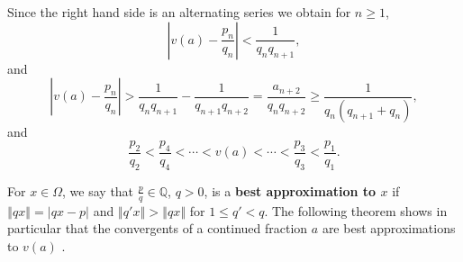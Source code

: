 \documentclass{amsart}
\newcommand{\norm}[1]{\left\Vert #1 \right\Vert}
\begin{document}
Since the right hand side is an alternating series we obtain for $n \geq 1$,
\begin{equation}
\left|  v(a)-\frac{p_n}{q_n} \right| < \frac{1}{q_n q_{n+1}},
\label{upperbound}
\end{equation}
and 
\begin{equation}
\left|  v(a)-\frac{p_n}{q_n} \right| > \frac{1}{q_nq_{n+1}}-\frac{1}{q_{n+1}q_{n+2}}=\frac{a_{n+2}}{q_n q_{n+2}} \geq \frac{1}{q_n(q_{n+1}+q_n)},
\label{lowerbound}
\end{equation}
and
\begin{equation}
\frac{p_2}{q_2}<\frac{p_4}{q_4}<\cdots<v(a)<\cdots<\frac{p_3}{q_3}<\frac{p_1}{q_1}.
\label{signs}
\end{equation}

For $x \in \Omega$, we say that $\frac{p}{q} \in \mathbb{Q}$, $q>0$, is a \textbf{best approximation to $x$}
if $\norm{qx} = |qx-p|$ and $\norm{q' x} > \norm{qx}$ for $1 \leq q'<q$.
The following theorem shows in particular that the convergents of a continued fraction $a$
are  best approximations to $v(a)$  \cite[p.~22, Chapter 2, \S 3, Theorem 1]{rockett}.
\end{document}
